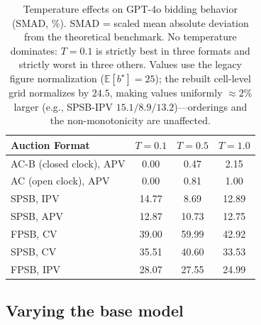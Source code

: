 \begin{table}[htbp]
\centering
\begin{tabular}{l|ccc}
\hline
Auction Format & $T=0.1$ & $T=0.5$ & $T=1.0$ \\
\hline
AC-B (closed clock), APV & 0.00 & 0.47 & 2.15 \\
AC (open clock), APV & 0.00 & 0.81 & 1.00 \\
SPSB, IPV & 14.77 & 8.69 & 12.89 \\
SPSB, APV & 12.87 & 10.73 & 12.75 \\
FPSB, CV & 39.00 & 59.99 & 42.92 \\
SPSB, CV & 35.51 & 40.60 & 33.53 \\
FPSB, IPV & 28.07 & 27.55 & 24.99 \\
\hline
\end{tabular}
\caption{Temperature effects on GPT-4o bidding behavior (SMAD, \%). SMAD = scaled mean absolute deviation from the theoretical benchmark. No temperature dominates: $T=0.1$ is strictly best in three formats and strictly worst in three others. Values use the legacy figure normalization ($\mathbb{E}[b^\star]=25$); the rebuilt cell-level grid normalizes by $24.5$, making values uniformly $\approx 2\%$ larger (e.g., SPSB-IPV $15.1/8.9/13.2$)---orderings and the non-monotonicity are unaffected.}
\label{tab:temperature}
\end{table}

\subsection{Varying the base model}

